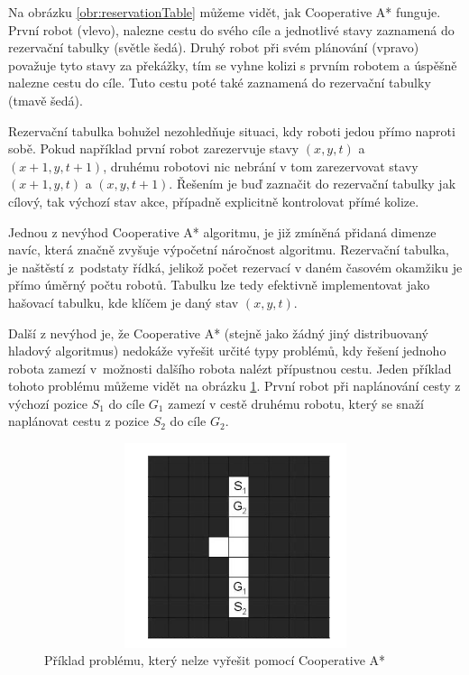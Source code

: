 Na obrázku \ref{obr:reservationTable} můžeme vidět, jak Cooperative A* funguje. První robot (vlevo), nalezne cestu do svého cíle a jednotlivé stavy zaznamená do rezervační tabulky (světle šedá). Druhý robot při svém plánování (vpravo) považuje tyto stavy za překážky, tím se vyhne kolizi s prvním robotem a úspěšně nalezne cestu do cíle. Tuto cestu poté také zaznamená do rezervační tabulky (tmavě šedá).

Rezervační tabulka bohužel nezohledňuje situaci, kdy roboti jedou přímo naproti sobě. Pokud například první robot zarezervuje stavy $\left(x,y,t\right)$ a $\left(x+1,y,t+1\right)$, druhému robotovi nic nebrání v tom zarezervovat stavy $\left(x+1,y,t\right)$ a $\left(x,y,t+1\right)$. Řešením je buď zaznačit do rezervační tabulky jak cílový, tak výchozí stav akce, případně explicitně kontrolovat přímé kolize.

Jednou z nevýhod Cooperative A* algoritmu, je již zmíněná přidaná dimenze navíc, která značně zvyšuje výpočetní náročnost algoritmu. Rezervační tabulka, je naštěstí z~podstaty řídká, jelikož počet rezervací v daném časovém okamžiku je přímo úměrný počtu robotů. Tabulku lze tedy efektivně implementovat jako hašovací tabulku, kde klíčem je daný stav $\left(x,y,t\right)$.

Další z nevýhod je, že Cooperative A* (stejně jako žádný jiný distribuovaný hladový algoritmus) nedokáže vyřešit určité typy problémů, kdy řešení jednoho robota zamezí v~možnosti dalšího robota nalézt přípustnou cestu. Jeden příklad tohoto problému můžeme vidět na obrázku \ref{obr:unsolvableCoopProblem}. První robot při naplánování cesty z výchozí pozice $S_1$ do cíle $G_1$ zamezí v cestě druhému robotu, který se snaží naplánovat cestu z pozice $S_2$ do cíle $G_2$.

\begin{figure}[htb]
	\begin{center}
		\includegraphics*[width=15cm,height=6cm,keepaspectratio]{obr/unsolvableCoopProblem}
	\end{center}
	\caption[caption]{Příklad problému, který nelze vyřešit pomocí Cooperative A* \cite{Silver2005}}
	\label{obr:unsolvableCoopProblem}
\end{figure}

